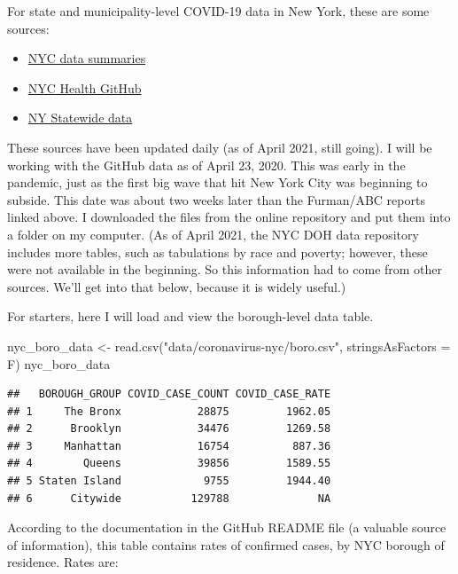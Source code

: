 \documentclass[
  openany]{book}
\newenvironment{Shaded}{\begin{snugshade}}{\end{snugshade}}
\newcommand{\AttributeTok}[1]{\textcolor[rgb]{0.77,0.63,0.00}{#1}}
\newcommand{\FunctionTok}[1]{\textcolor[rgb]{0.00,0.00,0.00}{#1}}
\newcommand{\NormalTok}[1]{#1}
\newcommand{\OtherTok}[1]{\textcolor[rgb]{0.56,0.35,0.01}{#1}}
\newcommand{\StringTok}[1]{\textcolor[rgb]{0.31,0.60,0.02}{#1}}
\providecommand{\tightlist}{%
  \setlength{\itemsep}{0pt}\setlength{\parskip}{0pt}}
\begin{document}
For state and municipality-level COVID-19 data in New York, these are some sources:

\begin{itemize}
\tightlist
\item
  \href{https://www1.nyc.gov/site/doh/covid/covid-19-data-archive.page}{NYC data summaries}
\item
  \href{https://github.com/nychealth/coronavirus-data}{NYC Health GitHub}
\item
  \href{https://health.data.ny.gov/Health/New-York-State-Statewide-COVID-19-Testing/xdss-u53e}{NY Statewide data}
\end{itemize}

These sources have been updated daily (as of April 2021, still going). I will be working with the GitHub data as of April 23, 2020. This was early in the pandemic, just as the first big wave that hit New York City was beginning to subside. This date was about two weeks later than the Furman/ABC reports linked above. I downloaded the files from the online repository and put them into a folder on my computer. (As of April 2021, the NYC DOH data repository includes more tables, such as tabulations by race and poverty; however, these were not available in the beginning. So this information had to come from other sources. We'll get into that below, because it is widely useful.)

For starters, here I will load and view the borough-level data table.

\begin{Shaded}
\begin{Highlighting}[]
\NormalTok{nyc\_boro\_data }\OtherTok{\textless{}{-}} \FunctionTok{read.csv}\NormalTok{(}\StringTok{"data/coronavirus{-}nyc/boro.csv"}\NormalTok{, }\AttributeTok{stringsAsFactors =}\NormalTok{ F)}
\NormalTok{nyc\_boro\_data}
\end{Highlighting}
\end{Shaded}

\begin{verbatim}
##   BOROUGH_GROUP COVID_CASE_COUNT COVID_CASE_RATE
## 1     The Bronx            28875         1962.05
## 2      Brooklyn            34476         1269.58
## 3     Manhattan            16754          887.36
## 4        Queens            39856         1589.55
## 5 Staten Island             9755         1944.40
## 6      Citywide           129788              NA
\end{verbatim}

According to the documentation in the GitHub README file (a valuable source of information), this table contains rates of confirmed cases, by NYC borough of residence. Rates are:
\end{document}
